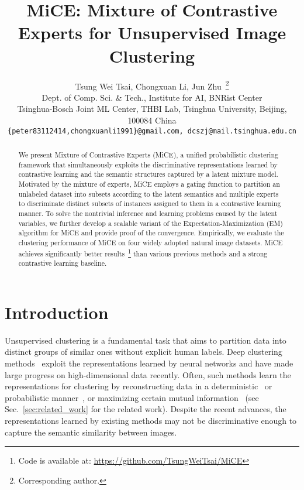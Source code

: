 \documentclass{article} \usepackage{iclr2021_conference,times}
\title{MiCE: Mixture of Contrastive Experts for Unsupervised Image Clustering}
\author{Tsung Wei Tsai, Chongxuan Li, Jun Zhu~\thanks{Corresponding author.} \\
Dept. of Comp. Sci. \& Tech., Institute for AI, BNRist Center\\
Tsinghua-Bosch Joint ML Center, THBI Lab, Tsinghua University, Beijing, 100084 China \\
\small{\texttt{\{peter83112414,chongxuanli1991\}@gmail.com, dcszj@mail.tsinghua.edu.cn}}}
\begin{document}
\maketitle

\begin{abstract}







We present Mixture of Contrastive Experts (MiCE), a unified probabilistic clustering framework that simultaneously exploits the discriminative representations learned by contrastive learning and the semantic structures captured by a latent mixture model. Motivated by the mixture of experts, MiCE employs a gating function to partition an unlabeled dataset into subsets according to the latent semantics and multiple experts to discriminate distinct subsets of instances assigned to them in a contrastive learning manner.
To solve the nontrivial inference and learning problems caused by the latent variables, we further develop a scalable variant of the Expectation-Maximization (EM) algorithm for MiCE and provide proof of the convergence. 
Empirically, we evaluate the clustering performance of MiCE on four widely adopted natural image datasets. MiCE achieves significantly better results~\footnote{Code is available at: \url{https://github.com/TsungWeiTsai/MiCE}} than various previous methods and a strong contrastive learning baseline.


\end{abstract}


\section{Introduction}





Unsupervised clustering is a fundamental task that aims to partition data into distinct groups of similar ones without explicit human labels. 
Deep clustering methods~\citep{xie2016unsupervised,wu2019deep}
exploit the representations learned by neural networks and
have made large progress on high-dimensional data recently. Often, such methods learn the representations for clustering by reconstructing data in a deterministic~\citep{ghasedi2017deep} or probabilistic manner~\citep{jiang2016variational}, or maximizing certain mutual information~\citep{hu2017learning,ji2019invariant} (see Sec.~\ref{sec:related_work} for the related work).
Despite the recent advances, the representations learned by existing methods may not be discriminative enough to capture the semantic similarity between images.
\end{document}
